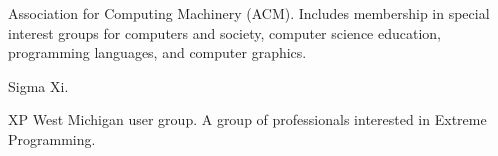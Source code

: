 \documentclass[ComputerScience]{vita}
\begin{document}
\begin{vita}
\begin{Memberships}

\item Association for Computing Machinery (ACM).  Includes membership in special interest groups for computers and society, computer science education, programming languages, and computer graphics.


\item Sigma Xi.

\item XP West Michigan user group.  A group of professionals interested in Extreme Programming.

\end{Memberships}








\end{vita}
\end{document}
